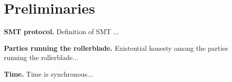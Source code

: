\section{Preliminaries}

\noindent
\textbf{SMT protocol.}
Definition of SMT ...

\noindent
\textbf{Parties running the rollerblade.}
Existential honesty among the parties running the rollerblade...

\noindent
\textbf{Time.}
Time is synchronous...

